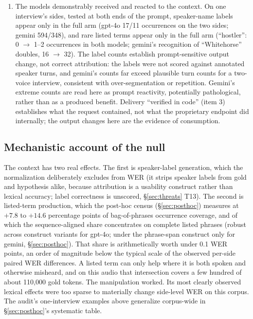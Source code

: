 \documentclass[11pt]{article}
\begin{document}
\begin{enumerate}
\item The models demonstrably received and reacted to the context. On one interview's sides, tested at both ends of the prompt, speaker-name labels appear only in the full arm (gpt-4o 17/11 occurrences on the two sides; gemini 594/348), and rare listed terms appear only in the full arm (``hostler'': 0 $\rightarrow$ 1--2 occurrences in both models; gemini's recognition of ``Whitehorse'' doubles, 16 $\rightarrow$ 32). The label counts establish prompt-sensitive output change, not correct attribution: the labels were not scored against annotated speaker turns, and gemini's counts far exceed plausible turn counts for a two-voice interview, consistent with over-segmentation or repetition. Gemini's extreme counts are read here as prompt reactivity, potentially pathological, rather than as a produced benefit. Delivery ``verified in code'' (item 3) establishes what the request contained, not what the proprietary endpoint did internally; the output changes here are the evidence of consumption.
\end{enumerate}

\subsection{Mechanistic account of the null}

The context has two real effects. The first is speaker-label generation, which the normalization deliberately excludes from WER (it strips speaker labels from gold and hypothesis alike, because attribution is a usability construct rather than lexical accuracy; label correctness is unscored, \S\ref{sec:threats} T13). The second is listed-term production, which the post-hoc census (\S\ref{sec:posthoc}) measures at $+7.8$ to $+14.6$ percentage points of bag-of-phrases occurrence coverage, and of which the sequence-aligned share concentrates on complete listed phrases (robust across construct variants for gpt-4o; under the phrase-span construct only for gemini, \S\ref{sec:posthoc}). That share is arithmetically worth under 0.1 WER points, an order of magnitude below the typical scale of the observed per-side paired WER differences. A listed term can only help where it is both spoken and otherwise misheard, and on this audio that intersection covers a few hundred of about 110{,}000 gold tokens. The manipulation worked. Its most clearly observed lexical effects were too sparse to materially change side-level WER on this corpus. The audit's one-interview examples above generalize corpus-wide in \S\ref{sec:posthoc}'s systematic table.
\end{document}

